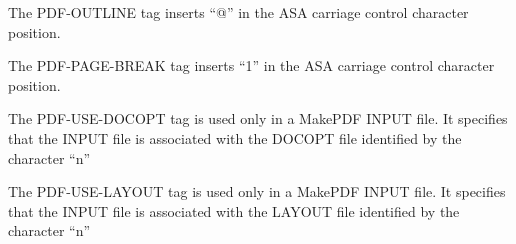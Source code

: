\documentclass[letterpaper,10pt,english]{sphinxmanual}
\begin{document}
The PDF-OUTLINE tag inserts “@” in the ASA carriage control character position.


\begin{sphinxVerbatim}[commandchars=\\\{\}]
  
\end{sphinxVerbatim}

The PDF-PAGE-BREAK tag inserts “1” in the ASA carriage control character position.


\begin{sphinxVerbatim}[commandchars=\\\{\}]
  
\end{sphinxVerbatim}

The PDF-USE-DOCOPT tag is used only in a MakePDF INPUT file. It specifies that the INPUT file is associated with the DOCOPT file identified by the character “n”


\begin{sphinxVerbatim}[commandchars=\\\{\}]
  
\end{sphinxVerbatim}

The PDF-USE-LAYOUT tag is used only in a MakePDF INPUT file. It specifies that the INPUT file is associated with the LAYOUT file identified by the character “n”


\begin{sphinxVerbatim}[commandchars=\\\{\}]
  
\end{sphinxVerbatim}
\end{document}
